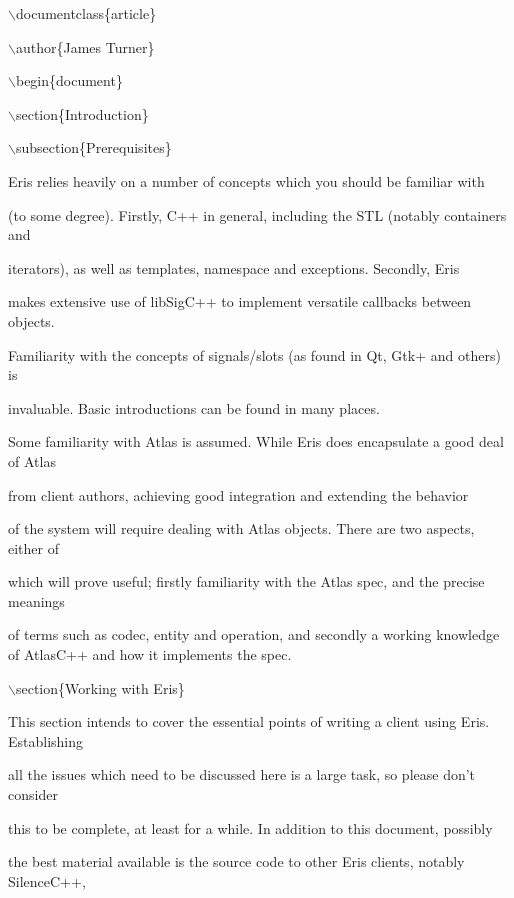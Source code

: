 \documentclass[12pt]{article}
\begin{document}
\ensuremath{\backslash}documentclass\{article\}

\ensuremath{\backslash}author\{James Turner\}

\ensuremath{\backslash}begin\{document\}



\ensuremath{\backslash}section\{Introduction\}



\ensuremath{\backslash}subsection\{Prerequisites\}

Eris relies heavily on a number of concepts which you should be familiar with

(to some degree). Firstly, C++ in general, including the STL (notably containers and

iterators), as well as templates,  namespace and exceptions. Secondly, Eris

makes extensive use of libSigC++ to implement versatile callbacks between objects.

Familiarity with the concepts of signals/slots (as found in Qt, Gtk+ and others) is

invaluable. Basic introductions can be found in many places.



Some familiarity with Atlas is assumed. While Eris does encapsulate a good deal of Atlas

from client authors, achieving good integration and extending the behavior

of the system will require dealing with Atlas objects. There are two aspects, either of

which will prove useful; firstly familiarity with the Atlas spec, and the precise meanings

of terms such as codec, entity and operation, and secondly a working knowledge of AtlasC++ and how it implements the spec.



\ensuremath{\backslash}section\{Working with Eris\}



This section intends to cover the essential points of writing a client using Eris. Establishing

all the issues which need to be discussed here is a large task, so please don't consider

this to be complete, at least for a while. In addition to this document, possibly

the best material available is the source code to other Eris clients, notably SilenceC++,
\end{document}
